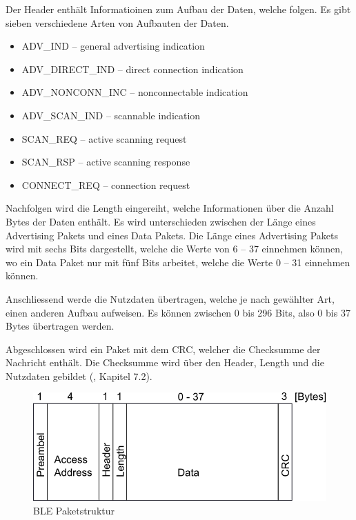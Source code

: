 Der Header enthält Informatioinen zum Aufbau der Daten, welche folgen. Es gibt sieben verschiedene Arten von Aufbauten der Daten.
\begin{itemize}
    \item ADV\_IND – general advertising indication
    \item ADV\_DIRECT\_IND – direct connection indication
    \item ADV\_NONCONN\_INC – nonconnectable indication
    \item ADV\_SCAN\_IND – scannable indication
    \item SCAN\_REQ – active scanning request
    \item SCAN\_RSP – active scanning response
    \item CONNECT\_REQ – connection request
\end{itemize}

Nachfolgen wird die Length eingereiht, welche Informationen über die Anzahl Bytes der Daten enthält. Es wird unterschieden zwischen der Länge eines Advertising Pakets und eines Data Pakets. Die Länge eines Advertising Pakets wird mit sechs Bits dargestellt, welche die Werte von 6 – 37 einnehmen können, wo ein Data Paket nur mit fünf Bits arbeitet, welche die Werte 0 – 31 einnehmen können.

Anschliessend werde die Nutzdaten übertragen, welche je nach gewählter Art, einen anderen Aufbau aufweisen. Es können zwischen 0 bis 296 Bits, also 0 bis 37 Bytes übertragen werden. 

Abgeschlossen wird ein Paket mit dem CRC, welcher die Checksumme der Nachricht enthält. Die Checksumme wird über den Header, Length und die Nutzdaten gebildet (\cite{BLE_Book}, Kapitel 7.2).


\begin{figure}[ht]
    \includegraphics[width=1.0\textwidth]{2TheoretischeGrundlagen/imag/BLEPaketstruktur.png}
    \caption{BLE Paketstruktur}
    \label{ble_paket} 
\end{figure}



